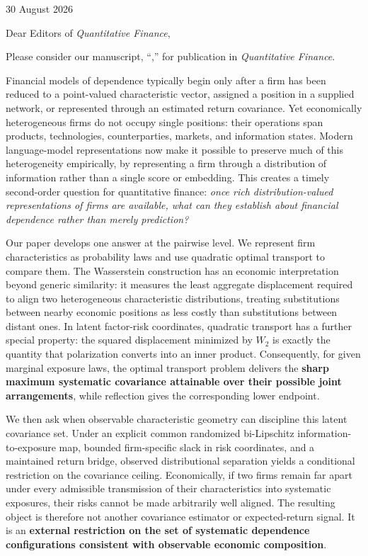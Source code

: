 \documentclass[11pt]{article}
\begin{document}
\fontsize{9.85pt}{11.6pt}\selectfont

\begin{flushright}
  30 August 2026
\end{flushright}

Dear Editors of \textit{Quantitative Finance},

Please consider our manuscript, ``\textbf{\papertitle},'' for publication in
\textit{Quantitative Finance}.

Financial models of dependence typically begin only after a firm has been
reduced to a point-valued characteristic vector, assigned a position in a
supplied network, or represented through an estimated return covariance.
Yet economically heterogeneous firms do not occupy single positions: their
operations span products, technologies, counterparties, markets, and information states.
Modern language-model representations now make it possible to preserve much
of this heterogeneity empirically, by representing a firm through a
distribution of information rather than a single score or embedding.
This creates a timely second-order question for quantitative finance:
\textit{once rich distribution-valued representations of firms are available,
what can they establish about financial dependence rather than merely prediction?}

Our paper develops one answer at the pairwise level.
We represent firm characteristics as probability laws and use quadratic
optimal transport to compare them.
The Wasserstein construction has an economic interpretation beyond generic
similarity: it measures the least aggregate displacement required to align
two heterogeneous characteristic distributions, treating substitutions
between nearby economic positions as less costly than substitutions between
distant ones.
In latent factor-risk coordinates, quadratic transport has a further special
property: the squared displacement minimized by $W_2$ is exactly the quantity
that polarization converts into an inner product.
Consequently, for given marginal exposure laws, the optimal transport problem
delivers the \textbf{sharp maximum systematic covariance attainable over
their possible joint arrangements}, while reflection gives the corresponding
lower endpoint.

We then ask when observable characteristic geometry can discipline this
latent covariance set.
Under an explicit common randomized bi-Lipschitz information-to-exposure map,
bounded firm-specific slack in risk coordinates, and a maintained return
bridge, observed distributional separation yields a conditional restriction
on the covariance ceiling.
Economically, if two firms remain far apart under every admissible
transmission of their characteristics into systematic exposures, their risks
cannot be made arbitrarily well aligned.
The resulting object is therefore not another covariance estimator or
expected-return signal.
It is an \textbf{external restriction on the set of systematic dependence
configurations consistent with observable economic composition}.
\end{document}
